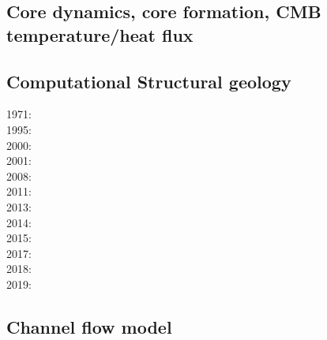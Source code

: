 \subsection{Core dynamics, core formation, CMB temperature/heat flux}

\noindent
{\scriptsize
\cite{hayu96}\cite{boeh96}
\cite{vayu98}
\cite{nata04c}
\cite{lahb08}\cite{gost08}\cite{sata08}
\cite{kisn09}
\cite{nata10}\cite{lamg10}\cite{sate10}
\cite{zhzh11}
\cite{cobu12}\cite{trbh12}
\cite{nata13}
\cite{lalt18}
\cite{yiym19}
}

\subsection{Computational Structural geology}

\noindent
{\scriptsize
1971: \cite{stbe71}\\
1995: \cite{fige95}\\
2000: \cite{acgf00}\cite{trla00}\\
2001: \cite{masc01}\\
2008: \cite{manc08}\cite{scsf08}\\
2011: \cite{frem11}\\
2013: \cite{soma13}\cite{lehl13}\\
2014: \cite{olbm14}\\
2015: \cite{pevp15}\cite{jalr15}\\
2017: \cite{naam17}\cite{scdu17}\\
2018: \cite{naam18}\\
2019: \cite{llor19}\cite{yada19}\cite{sogh19}
}

\subsection{Channel flow model} 


